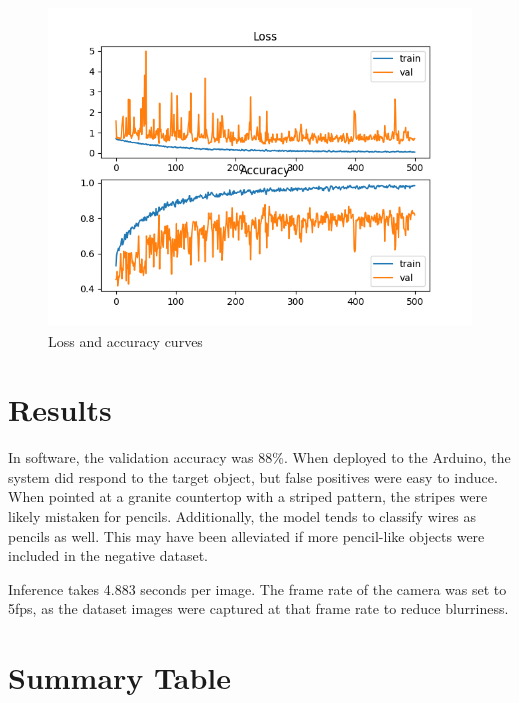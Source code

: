 \documentclass{article}
\begin{document}
\begin{figure}[h]
    \begin{center}
    \includegraphics[width=320pt,height=240pt]{images/training.png}
    \caption{Loss and accuracy curves}
    \label{fig:loss}
    \end{center}
\end{figure}

\section{Results}
In software, the validation accuracy was 88\%. When deployed
to the Arduino, the system did respond to the target object,
but false positives were easy to induce. When pointed at a
granite countertop with a striped pattern, the stripes were
likely mistaken for pencils. Additionally, the model tends
to classify wires as pencils as well. This may have been
alleviated if more pencil-like objects were included in the
negative dataset.

Inference takes 4.883 seconds per image. The frame rate of
the camera was set to 5fps, as the dataset images were
captured at that frame rate to reduce blurriness. 
\newpage
\section{Summary Table}
\end{document}
